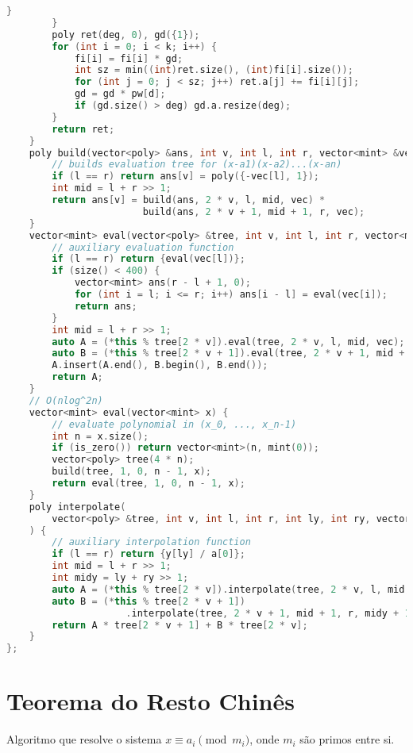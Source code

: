 \documentclass[10pt, a4paper, oneside]{book}
\begin{document}
\begin{lstlisting}[language=C++]
            }
        }
        poly ret(deg, 0), gd({1});
        for (int i = 0; i < k; i++) {
            fi[i] = fi[i] * gd;
            int sz = min((int)ret.size(), (int)fi[i].size());
            for (int j = 0; j < sz; j++) ret.a[j] += fi[i][j];
            gd = gd * pw[d];
            if (gd.size() > deg) gd.a.resize(deg);
        }
        return ret;
    }
    poly build(vector<poly> &ans, int v, int l, int r, vector<mint> &vec) {
        // builds evaluation tree for (x-a1)(x-a2)...(x-an)
        if (l == r) return ans[v] = poly({-vec[l], 1});
        int mid = l + r >> 1;
        return ans[v] = build(ans, 2 * v, l, mid, vec) *
                        build(ans, 2 * v + 1, mid + 1, r, vec);
    }
    vector<mint> eval(vector<poly> &tree, int v, int l, int r, vector<mint> &vec) {
        // auxiliary evaluation function
        if (l == r) return {eval(vec[l])};
        if (size() < 400) {
            vector<mint> ans(r - l + 1, 0);
            for (int i = l; i <= r; i++) ans[i - l] = eval(vec[i]);
            return ans;
        }
        int mid = l + r >> 1;
        auto A = (*this % tree[2 * v]).eval(tree, 2 * v, l, mid, vec);
        auto B = (*this % tree[2 * v + 1]).eval(tree, 2 * v + 1, mid + 1, r, vec);
        A.insert(A.end(), B.begin(), B.end());
        return A;
    }
    // O(nlog^2n)
    vector<mint> eval(vector<mint> x) {
        // evaluate polynomial in (x_0, ..., x_n-1)
        int n = x.size();
        if (is_zero()) return vector<mint>(n, mint(0));
        vector<poly> tree(4 * n);
        build(tree, 1, 0, n - 1, x);
        return eval(tree, 1, 0, n - 1, x);
    }
    poly interpolate(
        vector<poly> &tree, int v, int l, int r, int ly, int ry, vector<mint> &y
    ) {
        // auxiliary interpolation function
        if (l == r) return {y[ly] / a[0]};
        int mid = l + r >> 1;
        int midy = ly + ry >> 1;
        auto A = (*this % tree[2 * v]).interpolate(tree, 2 * v, l, mid, ly, midy, y);
        auto B = (*this % tree[2 * v + 1])
                     .interpolate(tree, 2 * v + 1, mid + 1, r, midy + 1, ry, y);
        return A * tree[2 * v + 1] + B * tree[2 * v];
    }
};
\end{lstlisting}
\hfill

\section{Teorema do Resto Chinês}


Algoritmo que resolve o sistema $x \equiv a_i \pmod{m_i}$, onde $m_i$ são primos entre si.
\end{document}
